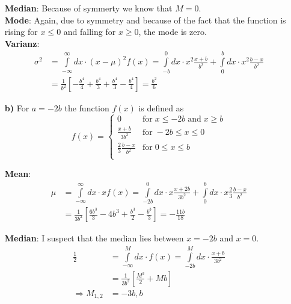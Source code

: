 \documentclass[10pt]{article}
\newenvironment{myfont}{\fontfamily{put}\selectfont}{\par}
\begin{document}
\begin{myfont}
\begin{itemize}
  \noindent \textbf{Median}: Because of symmerty we know that $M = 0$. \\

  \noindent \textbf{Mode}: Again, due to symmetry and because of the fact that the function is rising for $x \leq 0$ and falling for $x \geq 0$, the mode is zero. \\

  \noindent \textbf{Varianz}:
  \begin{align*}
  \sigma^{2} & = \int\limits_{-\infty}^{\infty}dx \cdot (x - \mu)^{2}f(x) = \int\limits_{-b}^{0}dx \cdot x^{2}\frac{x+b}{b^{2}} + \int\limits_{0}^{b}dx \cdot x^{2}\frac{b-x}{b^{2}} \\
             & = \frac{1}{b^{2}}\left[-\frac{b^{4}}{4} + \frac{b^{4}}{3} + \frac{b^{4}}{3} - \frac{b^{4}}{4}\right] = \frac{b^{2}}{6}
  \end{align*}

  \item[\textbf{b)}] For $a = -2b$ the function $f(x)$ is defined as
  $$
  f(x) = 
  \begin{cases}
  0                            & \textrm{for}\; x \leq -2b \; \textrm{and}\; x \geq b \\
  \frac{x+b}{3b^{2}}           & \textrm{for}\; -2b \leq x \leq 0 \\
  \frac{2}{3}\frac{b-x}{b^{2}} & \textrm{for}\; 0 \leq x \leq b \\
  \end{cases}
  $$

  \noindent \textbf{Mean}:
  \begin{align*}
  \mu & = \int\limits_{-\infty}^{\infty}dx \cdot xf(x) = \int\limits_{-2b}^{0}dx \cdot x\frac{x+2b}{3b^{2}} + \int\limits_{0}^{b}dx \cdot x\frac{2}{3}\frac{b-x}{b^{2}} \\
      & = \frac{1}{3b^{2}}\left[\frac{6b^{3}}{3} - 4b^{3} + \frac{b^{3}}{2} - \frac{b^{3}}{3}\right] = -\frac{11b}{18}
  \end{align*}


  \noindent \textbf{Median}: I suspect that the median lies between $x = -2b$ and $x = 0$.
  \begin{align*}
  \frac{1}{2}         & = \int\limits_{-\infty}^{M}dx \cdot f(x) = \int\limits_{-2b}^{M}dx \cdot \frac{x+b}{3b^{2}} \\
                      & = \frac{1}{3b^{2}} \left[\frac{M^{2}}{2} + Mb\right] \\
  \Rightarrow M_{1,2} & = -3b, b
  \end{align*}


\end{itemize}
\end{myfont}
\end{document}
